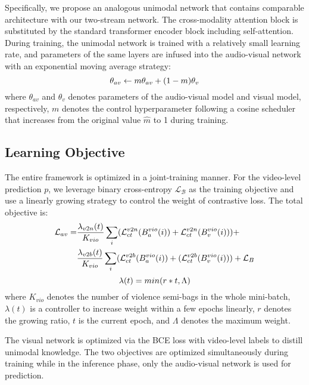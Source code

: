 \documentclass[sigconf]{acmart}
\begin{document}
Specifically, we propose an analogous unimodal network that contains comparable architecture with our two-stream network. The cross-modality attention block is substituted by the standard transformer encoder block including self-attention. During training, the unimodal network is trained with a relatively small learning rate, and parameters of the same layers are infused into the audio-visual network with an exponential moving average strategy:
\begin{equation}
\small
    \theta_{av} \gets m\theta_{av} + (1-m)\theta_v 
\end{equation}
where $\theta_{av}$ and $\theta_{v}$ denotes parameters of the audio-visual model and visual model, respectively, $m$ denotes the control hyperparameter following a cosine scheduler that increases from the original value $\hat{m}$ to 1 during training.

\subsection{Learning Objective}

The entire framework is optimized in a joint-training manner. For the video-level prediction $p$, we leverage binary cross-entropy $\mathcal{L}_\mathcal{B}$ as the training objective and use a linearly growing strategy to control the weight of contrastive loss. The total objective is:
\begin{equation}
\begin{split}
\small
    \mathcal{L}_{av} = &\frac{\lambda_{v2n}(t)}{K_{vio}}\sum_{i}
    (\mathcal{L}_{ct}^{v2n}(B_a^{vio}(i)) + \mathcal{L}_{ct}^{v2n}(B_v^{vio}(i))) + \\&    \frac{\lambda_{v2b}(t)}{K_{vio}}\sum_{i}
    (\mathcal{L}_{ct}^{v2b}(B_a^{vio}(i)) + (\mathcal{L}_{ct}^{v2b}(B_v^{vio}(i))) + \mathcal{L}_{B}
\end{split}
\end{equation}
\begin{equation}
\small
    \lambda(t) = min(r*t, \Lambda)
\end{equation}
where $K_{vio}$ denotes the number of violence semi-bags in the whole mini-batch, $\lambda(t)$ is a controller to increase weight within a few epochs linearly, $r$ denotes the growing ratio, $t$ is the current epoch, and $\Lambda$ denotes the maximum weight. 

The visual network is optimized via the BCE loss with video-level labels to distill unimodal knowledge. The two objectives are optimized simultaneously during training while in the inference phase, only the audio-visual network is used for prediction.
\end{document}
